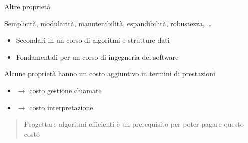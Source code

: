 \begin{frame}{Altre proprietà}

Semplicità, modularità, manutenibilità, espandibilità, robustezza, \ldots
\begin{itemize}
\item Secondari in un corso di algoritmi e strutture dati
\item Fondamentali per un corso di ingegneria del software
\end{itemize}

\medskip
\begin{myboxtitle}[Commento]
Alcune proprietà hanno un costo aggiuntivo in termini di prestazioni
\begin{itemize}
\item {} $\rightarrow$ costo gestione chiamate
\item {} $\rightarrow$ costo interpretazione
\end{itemize}
\begin{quote}
Progettare algoritmi efficienti è un prerequisito per poter pagare questo costo
\end{quote}
\end{myboxtitle}	
	
\end{frame}










